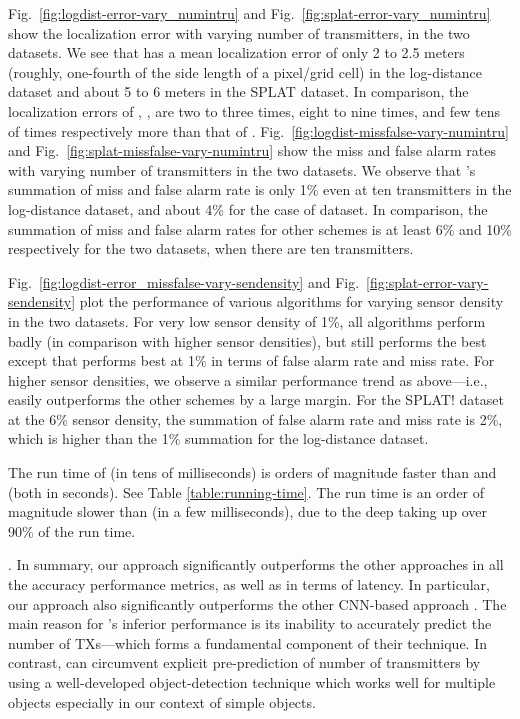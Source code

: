 Fig.~\ref{fig:logdist-error-vary_numintru} and Fig.~\ref{fig:splat-error-vary_numintru} show the localization error with varying number of transmitters, in the two datasets. We see that \our has a mean localization error of only 2 to 2.5 meters (roughly, one-fourth of the side length of a pixel/grid cell) in the log-distance dataset and about 5 to 6 meters in the SPLAT dataset. In comparison, the
localization errors of \map, \splot, \deeptx are two to three times, eight to nine times, and 
few tens of times respectively more than that of \our. 
Fig.~\ref{fig:logdist-missfalse-vary-numintru} and Fig.~\ref{fig:splat-missfalse-vary-numintru} show the miss and false alarm rates with varying number of transmitters in the two datasets.
We observe that \our's summation of miss and false alarm rate is only 1\% even at 
ten transmitters in the log-distance dataset, and about 4\% for the case of \splat dataset. 
In comparison, the summation of miss and false alarm rates for other schemes is at least 6\% and
10\% respectively for the two datasets, when there are ten transmitters.

Fig.~\ref{fig:logdist-error_missfalse-vary-sendensity} and Fig.~\ref{fig:splat-error-vary-sendensity} plot the performance of various algorithms for varying sensor density in the two datasets. For very low sensor density of 1\%, all algorithms perform 
badly (in comparison with higher sensor densities), but \our still performs the best except that \map performs best at 1\% in terms of false alarm rate and miss rate.
For higher sensor densities, we observe a similar performance trend as above---i.e., \our easily outperforms the other schemes by a large margin.
For the SPLAT! dataset at the 6\% sensor density, the summation of false alarm rate and miss rate is 2\%, which is higher than the 1\% summation for the log-distance dataset.

The run time of \our (in tens of milliseconds) is orders of magnitude faster than \map and \splot (both in seconds). 
See Table \ref{table:running-time}. 
The \our run time is an order of magnitude slower than \deeptx (in a few milliseconds), due to the deep \yolocust taking up over 90\% of the run time.


. 
In summary, our approach significantly outperforms the other approaches in all the accuracy performance metrics, as well as in terms of latency. 
In particular, our approach also significantly outperforms the other CNN-based approach \deeptx. 
The main reason for \deeptx's inferior performance is its inability to accurately predict the number of TXs---which 
forms a fundamental component of their technique. In contrast, \our can circumvent explicit pre-prediction
of number of transmitters by using a well-developed object-detection technique which works well for multiple objects 
especially in our context of simple objects.


